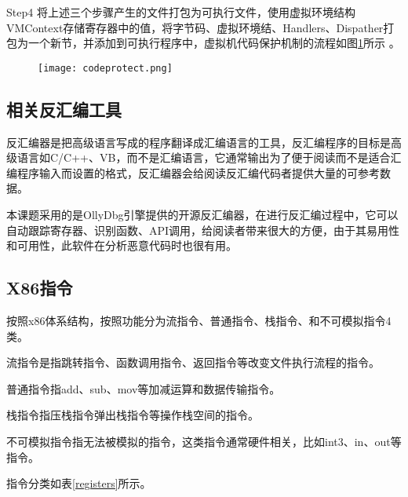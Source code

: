 Step4 将上述三个步骤产生的文件打包为可执行文件，使用虚拟环境结构VMContext存储寄存器中的值，将字节码、虚拟环境结、Handlers、Dispather打包为一个新节，并添加到可执行程序中，虚拟机代码保护机制的流程如图\ref{codeprotect}所示 。
\begin{figure}[htbp]
	\centering
	\texttt{[image: codeprotect.png]}
	\label{codeprotect}
\end{figure}

\subsection{相关反汇编工具}

反汇编器是把高级语言写成的程序翻译成汇编语言的工具，反汇编程序的目标是高级语言如C/C++、VB，而不是汇编语言，它通常输出为了便于阅读而不是适合汇编程序输入而设置的格式，反汇编器会给阅读反汇编代码者提供大量的可参考数据\cite{张泉2018Win32}。

本课题采用的是OllyDbg引擎提供的开源反汇编器，在进行反汇编过程中，它可以自动跟踪寄存器、识别函数、API调用，给阅读者带来很大的方便，由于其易用性和可用性，此软件在分析恶意代码时也很有用\cite{乐德广2018一种抵御逆向工程的安卓应用混淆技术研究}。

\subsection{X86指令}

按照x86体系结构，按照功能分为流指令、普通指令、栈指令、和不可模拟指令4类\cite{曹宏盛2019一种用于}。

流指令是指跳转指令、函数调用指令、返回指令等改变文件执行流程的指令。

普通指令指add、sub、mov等加减运算和数据传输指令。

栈指令指压栈指令弹出栈指令等操作栈空间的指令。

不可模拟指令指无法被模拟的指令，这类指令通常硬件相关，比如int3、in、out等指令。

指令分类如表\ref{registers}所示。


